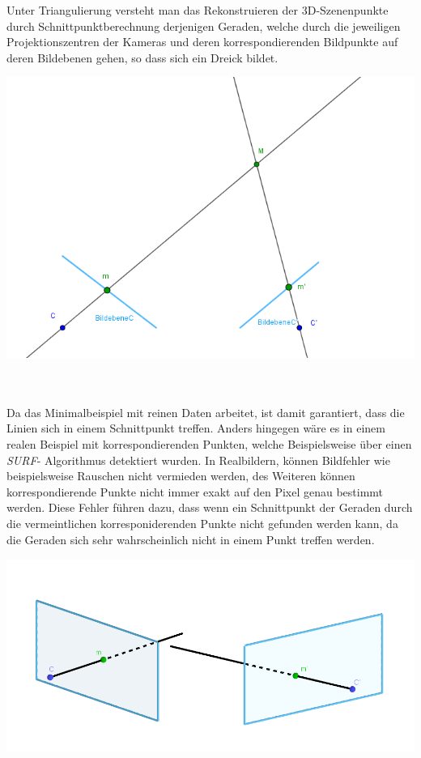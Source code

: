 Unter Triangulierung versteht man das Rekonstruieren der 3D-Szenenpunkte durch Schnittpunktberechnung derjenigen Geraden, welche durch die jeweiligen Projektionszentren der Kameras und deren korrespondierenden Bildpunkte auf deren Bildebenen gehen, so dass sich ein Dreick bildet.\\


\begin{minipage}{\linewidth}
	\centering
	\includegraphics[width=0.8\linewidth]{images/optimaleTriangulierung.png}
\end{minipage}\\ \\


Da das Minimalbeispiel mit reinen Daten arbeitet, ist damit garantiert, dass die Linien sich in einem Schnittpunkt treffen. Anders hingegen wäre es in einem realen Beispiel mit korrespondierenden Punkten, welche Beispielsweise über einen \textit{SURF}- Algorithmus detektiert wurden\cite{Mandun}. In Realbildern, können Bildfehler wie beispielsweise Rauschen nicht vermieden werden, des Weiteren können korrespondierende Punkte nicht immer exakt auf den Pixel genau bestimmt werden. Diese Fehler führen dazu, dass wenn ein Schnittpunkt der Geraden durch die vermeintlichen korresponiderenden Punkte nicht gefunden werden kann, da die Geraden sich sehr wahrscheinlich nicht in einem Punkt treffen werden\cite{Mandun,HZ}. 


\begin{minipage}{\linewidth}
	\centering
	\includegraphics[width=0.8\linewidth]{images/problemTriangulation.png}
\end{minipage}\\ 

